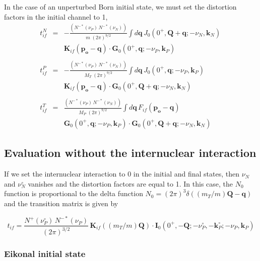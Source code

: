 In the case of an unperturbed Born initial state, we must set the
distortion factors in the initial channel to 1,
\begin{eqnarray}\label{Q:tn_if-cdw-b1}
t^{N}_{if}&=& -\frac{\left(N^{-*}(\nu_{P}) \,N^{-*}(\nu_{N}) \right)}{m
\; (2 \pi)^{9/2}} \int d \bm{q} \, J_{0}(0^{+}, \bm{Q} + \bm{q};
-\nu_{N}, \bm{k}_{N} ) \,
  \\
&& \bm{K}_{if}(\bm{p_{o}}- \bm{q}) \cdot \bm{G}_{0}( 0^{+} ,
\bm{q};-\nu_{P},\bm{k}_{P}) \nonumber
  \\
\nonumber \\
t^{P}_{if}&=& -\frac{\left(N^{-*}(\nu_{P}) \,N^{-*}(\nu_{N})
\right)}{M_{T} \; (2 \pi)^{9/2}} \int d \bm{q} \, J_{0}( 0^{+} ,
\bm{q};-\nu_{P},\bm{k}_{P})  \,
  \\
&& \bm{K}_{if}(\bm{p_{o}}- \bm{q}) \cdot \bm{G}_{0}(0^{+}, \bm{Q} +
\bm{q}; -\nu_{N}, \bm{k}_{N} )\nonumber
  \\
\nonumber \\
t^{T}_{if}&=& \frac{\left(N^{-*}(\nu_{P}) \,N^{-*}(\nu_{N})
\right)}{M_{P} \; (2 \pi)^{9/2}} \int d \bm{q} \, F_{if}(\bm{p_{o}}-
\bm{q})
  \\
&&  \bm{G}_{0}( 0^{+} , \bm{q};-\nu_{P},\bm{k}_{P})\cdot
\bm{G}_{0}(0^{+}, \bm{Q} + \bm{q}; -\nu_{N}, \bm{k}_{N} )\nonumber
\end{eqnarray}

\subsection{Evaluation without the internuclear interaction}

If we set the internuclear interaction to 0 in the initial and final
states, then $\nu_{N}$ and $\nu_{N}^{\circ}$ vanishes and the distortion
factors are equal to 1. In this case, the $N_{0}$ function is
proportional to the delta function $N_{0}= (2 \pi)^{3}
\delta((m_{T}/m)\bm{Q} - \bm{q})$ and the transition matrix is given by

\begin{equation}\label{Q:tif-noN}
t_{if} = \frac{N^{+}(\nu_{P}^{\circ})\,N^{-*}(\nu_{P})}{(2 \pi)^{3/2}}\,
\bm{K}_{if}((m_{T}/m)\bm{Q})  \cdot \bm{I}_{0}( 0^{+} , -\bm{Q};
-\nu_{P}^{\circ}, -\bm{k}_{P}^{\circ};-\nu_{P},\bm{k}_{P})
\end{equation}

\subsubsection*{Eikonal initial state}

